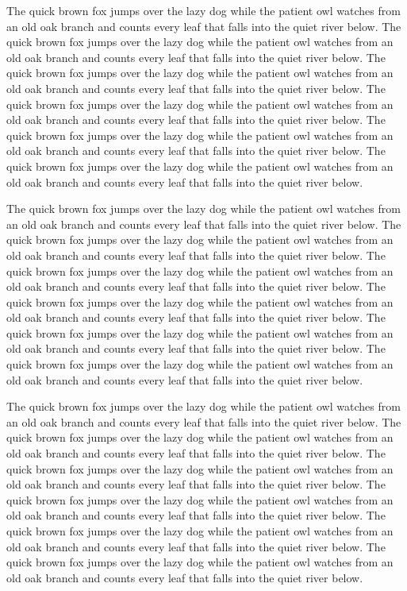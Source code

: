 The quick brown fox jumps over the lazy dog while the patient owl watches from an old oak branch and counts every leaf that falls into the quiet river below. The quick brown fox jumps over the lazy dog while the patient owl watches from an old oak branch and counts every leaf that falls into the quiet river below. The quick brown fox jumps over the lazy dog while the patient owl watches from an old oak branch and counts every leaf that falls into the quiet river below. The quick brown fox jumps over the lazy dog while the patient owl watches from an old oak branch and counts every leaf that falls into the quiet river below. The quick brown fox jumps over the lazy dog while the patient owl watches from an old oak branch and counts every leaf that falls into the quiet river below. The quick brown fox jumps over the lazy dog while the patient owl watches from an old oak branch and counts every leaf that falls into the quiet river below.

The quick brown fox jumps over the lazy dog while the patient owl watches from an old oak branch and counts every leaf that falls into the quiet river below. The quick brown fox jumps over the lazy dog while the patient owl watches from an old oak branch and counts every leaf that falls into the quiet river below. The quick brown fox jumps over the lazy dog while the patient owl watches from an old oak branch and counts every leaf that falls into the quiet river below. The quick brown fox jumps over the lazy dog while the patient owl watches from an old oak branch and counts every leaf that falls into the quiet river below. The quick brown fox jumps over the lazy dog while the patient owl watches from an old oak branch and counts every leaf that falls into the quiet river below. The quick brown fox jumps over the lazy dog while the patient owl watches from an old oak branch and counts every leaf that falls into the quiet river below.

The quick brown fox jumps over the lazy dog while the patient owl watches from an old oak branch and counts every leaf that falls into the quiet river below. The quick brown fox jumps over the lazy dog while the patient owl watches from an old oak branch and counts every leaf that falls into the quiet river below. The quick brown fox jumps over the lazy dog while the patient owl watches from an old oak branch and counts every leaf that falls into the quiet river below. The quick brown fox jumps over the lazy dog while the patient owl watches from an old oak branch and counts every leaf that falls into the quiet river below. The quick brown fox jumps over the lazy dog while the patient owl watches from an old oak branch and counts every leaf that falls into the quiet river below. The quick brown fox jumps over the lazy dog while the patient owl watches from an old oak branch and counts every leaf that falls into the quiet river below.


